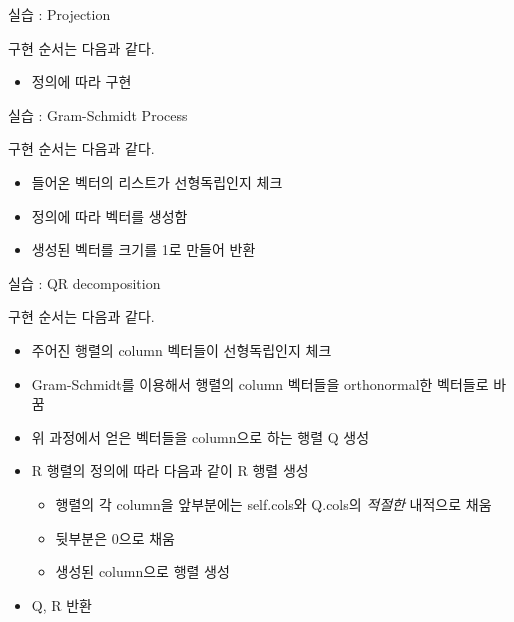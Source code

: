 \documentclass{beamer}
\begin{document}
\begin{frame}{실습 : Projection}

구현 순서는 다음과 같다. 
\begin{itemize} 
\item 정의에 따라 구현 
\end{itemize}
\end{frame}


\begin{frame}{실습 : Gram-Schmidt Process}

구현 순서는 다음과 같다. 
\begin{itemize} 
\item 들어온 벡터의 리스트가 선형독립인지 체크 
\item 정의에 따라 벡터를 생성함
\item 생성된 벡터를 크기를 1로 만들어 반환 
\end{itemize}
\end{frame}


\begin{frame}{실습 : QR decomposition}

구현 순서는 다음과 같다. 
\begin{itemize} 
\item 주어진 행렬의 column 벡터들이 선형독립인지 체크 
\item Gram-Schmidt를 이용해서 행렬의 column 벡터들을 orthonormal한 벡터들로 바꿈 
\item 위 과정에서 얻은 벡터들을 column으로 하는 행렬 Q 생성
\item R 행렬의 정의에 따라 다음과 같이 R 행렬 생성 
\begin{itemize} 
\item 행렬의 각 column을 앞부분에는 self.cols와 Q.cols의 \textit{적절한} 내적으로 채움 
\item 뒷부분은 0으로 채움 
\item 생성된 column으로 행렬 생성 
\end{itemize}
\item Q, R 반환
\end{itemize}
\end{frame}




\end{document}
